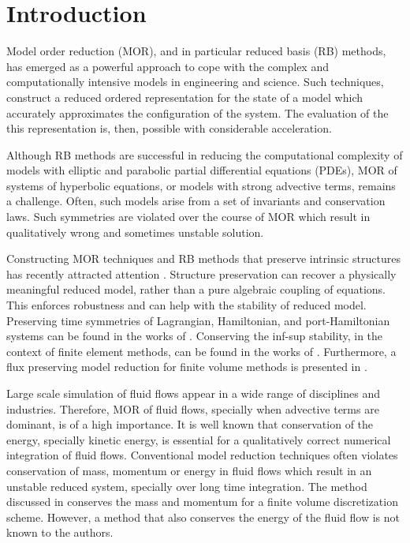\section{Introduction} \label{sec:intro}

Model order reduction (MOR), and in particular reduced basis (RB) methods, has emerged as a powerful approach to cope with the complex and computationally intensive models in engineering and science. Such techniques, construct a reduced ordered representation for the state of a model which accurately approximates the configuration of the system. The evaluation of the this representation is, then, possible with considerable acceleration.

Although RB methods are successful in reducing the computational complexity of models with elliptic and parabolic partial differential equations (PDEs), MOR of systems of hyperbolic equations, or models with strong advective terms, remains a challenge. Often, such models arise from a set of invariants and conservation laws. Such symmetries are violated over the course of MOR which result in qualitatively wrong and sometimes unstable solution.

Constructing MOR techniques and RB methods that preserve intrinsic structures has recently attracted attention \cite{doi:10.1137/17M1111991,1705.00498,kalashnikova2014stabilization,farhat2015structure,doi:10.1137/110836742,beattie2011structure,doi:10.1137/140978922}. Structure preservation can recover a physically meaningful reduced model, rather than a pure algebraic coupling of equations. This enforces robustness and can help with the stability of reduced model. Preserving time symmetries of Lagrangian, Hamiltonian, and port-Hamiltonian systems can be found in the works of \cite{Carlberg:2014ky,doi:10.1137/140978922,doi:10.1137/17M1111991,1705.00498,beattie2011structure,chaturantabut2016structure,gugercin2012structure}. Conserving the inf-sup stability, in the context of finite element methods, can be found in the works of \cite{farhat2015structure,ballarin2015supremizer}. Furthermore, a flux preserving model reduction for finite volume methods is presented in \cite{carlberg2018conservative}. 

Large scale simulation of fluid flows appear in a wide range of disciplines and industries. Therefore, MOR of fluid flows, specially when advective terms are dominant, is of a high importance. It is well known that conservation of the energy, specially kinetic energy, is essential for a qualitatively correct numerical integration of fluid flows. Conventional model reduction techniques often violates conservation of mass, momentum or energy in fluid flows which result in an unstable reduced system, specially over long time integration. The method discussed in \cite{carlberg2018conservative} conserves the mass and momentum for a finite volume discretization scheme. However, a method that also conserves the energy of the fluid flow is not known to the authors.

